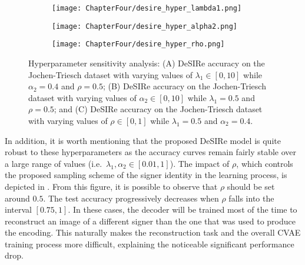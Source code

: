 \begin{figure*}
    \centering
    \begin{subfigure}{0.325\textwidth}
        \centering
        \texttt{[image: ChapterFour/desire\_hyper\_lambda1.png]}
        \caption{}
        \label{fig:desire_hyper_lambda1}
    \end{subfigure}
    \hfill
    \begin{subfigure}{0.325\textwidth}
        \centering
        \texttt{[image: ChapterFour/desire\_hyper\_alpha2.png]}
        \caption{}
        \label{fig:desire_hyper_alpha2}
    \end{subfigure}
    \hfill
    \begin{subfigure}{0.325\textwidth}
        \centering
        \texttt{[image: ChapterFour/desire\_hyper\_rho.png]}
        \caption{}
        \label{fig:desire_hyper_rho}
    \end{subfigure}
    \caption{Hyperparameter sensitivity analysis: (A) DeSIRe accuracy on the Jochen-Triesch dataset with varying values of $\lambda_{1}\in[0,10]$ while $\alpha_{2}=0.4$ and $\rho=0.5$; (B) DeSIRe accuracy on the Jochen-Triesch dataset with varying values of $\alpha_{2}\in[0,10]$ while $\lambda_{1}=0.5$ and $\rho=0.5$; and (C) DeSIRe accuracy on the Jochen-Triesch dataset with varying values of $\rho\in[0,1]$ while $\lambda_{1}=0.5$ and $\alpha_{2}=0.4$.}
    \label{fig:desire_hyperparams}
\end{figure*}

In addition, it is worth mentioning that the proposed DeSIRe model is quite robust to these hyperparameters as the accuracy curves remain fairly stable over a large range of values (i.e.\ $\lambda_{1},\alpha_{2}\in [0.01, 1]$). The impact of $\rho$, which controls the proposed sampling scheme of the signer identity in the learning process, is depicted in . From this figure, it is possible to observe that $\rho$ should be set around $0.5$. The test accuracy progressively decreases when $\rho$ falls into the interval $[0.75, 1]$. In these cases, the decoder will be trained most of the time to reconstruct an image of a different signer than the one that was used to produce the encoding. This naturally makes the reconstruction task and the overall CVAE training process more difficult, explaining the noticeable significant performance drop.
